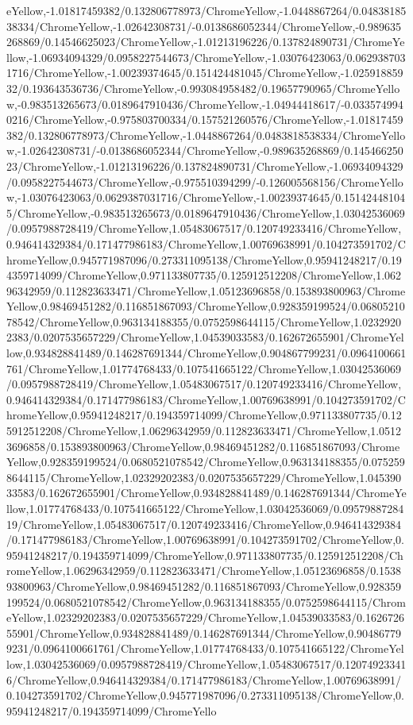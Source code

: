 {\begin{tikzternal}
{eYellow,-1.01817459382/0.132806778973/ChromeYellow,-1.0448867264/0.0483818538334/ChromeYellow,-1.02642308731/-0.0138686052344/ChromeYellow,-0.989635268869/0.14546625023/ChromeYellow,-1.01213196226/0.137824890731/ChromeYellow,-1.06934094329/0.0958227544673/ChromeYellow,-1.03076423063/0.0629387031716/ChromeYellow,-1.00239374645/0.151424481045/ChromeYellow,-1.02591885932/0.193643536736/ChromeYellow,-0.993084958482/0.19657790965/ChromeYellow,-0.983513265673/0.0189647910436/ChromeYellow,-1.04944418617/-0.0335749940216/ChromeYellow,-0.975803700334/0.157521260576/ChromeYellow,-1.01817459382/0.132806778973/ChromeYellow,-1.0448867264/0.0483818538334/ChromeYellow,-1.02642308731/-0.0138686052344/ChromeYellow,-0.989635268869/0.14546625023/ChromeYellow,-1.01213196226/0.137824890731/ChromeYellow,-1.06934094329/0.0958227544673/ChromeYellow,-0.975510394299/-0.126005568156/ChromeYellow,-1.03076423063/0.0629387031716/ChromeYellow,-1.00239374645/0.151424481045/ChromeYellow,-0.983513265673/0.0189647910436/ChromeYellow,1.03042536069/0.0957988728419/ChromeYellow,1.05483067517/0.120749233416/ChromeYellow,0.946414329384/0.171477986183/ChromeYellow,1.00769638991/0.104273591702/ChromeYellow,0.945771987096/0.273311095138/ChromeYellow,0.95941248217/0.194359714099/ChromeYellow,0.971133807735/0.125912512208/ChromeYellow,1.06296342959/0.112823633471/ChromeYellow,1.05123696858/0.153893800963/ChromeYellow,0.98469451282/0.116851867093/ChromeYellow,0.928359199524/0.0680521078542/ChromeYellow,0.963134188355/0.0752598644115/ChromeYellow,1.02329202383/0.0207535657229/ChromeYellow,1.04539033583/0.162672655901/ChromeYellow,0.934828841489/0.146287691344/ChromeYellow,0.904867799231/0.0964100661761/ChromeYellow,1.01774768433/0.107541665122/ChromeYellow,1.03042536069/0.0957988728419/ChromeYellow,1.05483067517/0.120749233416/ChromeYellow,0.946414329384/0.171477986183/ChromeYellow,1.00769638991/0.104273591702/ChromeYellow,0.95941248217/0.194359714099/ChromeYellow,0.971133807735/0.125912512208/ChromeYellow,1.06296342959/0.112823633471/ChromeYellow,1.05123696858/0.153893800963/ChromeYellow,0.98469451282/0.116851867093/ChromeYellow,0.928359199524/0.0680521078542/ChromeYellow,0.963134188355/0.0752598644115/ChromeYellow,1.02329202383/0.0207535657229/ChromeYellow,1.04539033583/0.162672655901/ChromeYellow,0.934828841489/0.146287691344/ChromeYellow,1.01774768433/0.107541665122/ChromeYellow,1.03042536069/0.0957988728419/ChromeYellow,1.05483067517/0.120749233416/ChromeYellow,0.946414329384/0.171477986183/ChromeYellow,1.00769638991/0.104273591702/ChromeYellow,0.95941248217/0.194359714099/ChromeYellow,0.971133807735/0.125912512208/ChromeYellow,1.06296342959/0.112823633471/ChromeYellow,1.05123696858/0.153893800963/ChromeYellow,0.98469451282/0.116851867093/ChromeYellow,0.928359199524/0.0680521078542/ChromeYellow,0.963134188355/0.0752598644115/ChromeYellow,1.02329202383/0.0207535657229/ChromeYellow,1.04539033583/0.162672655901/ChromeYellow,0.934828841489/0.146287691344/ChromeYellow,0.904867799231/0.0964100661761/ChromeYellow,1.01774768433/0.107541665122/ChromeYellow,1.03042536069/0.0957988728419/ChromeYellow,1.05483067517/0.120749233416/ChromeYellow,0.946414329384/0.171477986183/ChromeYellow,1.00769638991/0.104273591702/ChromeYellow,0.945771987096/0.273311095138/ChromeYellow,0.95941248217/0.194359714099/ChromeYello}
\end{tikzternal}}
